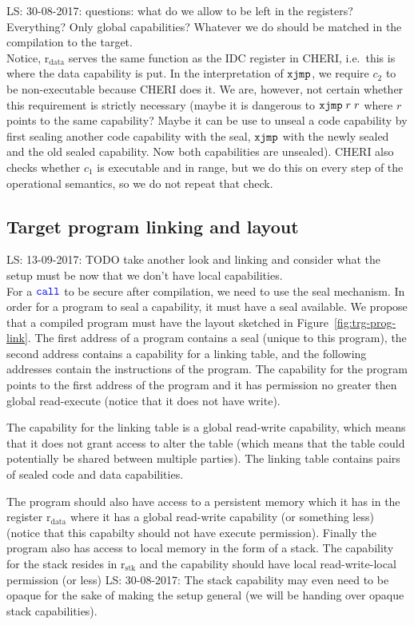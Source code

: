\documentclass[a4paper]{article}
\newcommand\lau[1]{{\color{purple} \sf \footnotesize {LS: #1}}\\}
\newcommand{\sourcecolor}[1]{\color{blue}}
\newcommand{\src}[1]{{\sourcecolor{} #1}}
\newcommand{\targetcolor}[1]{\color{black}}
\newcommand{\trg}[1]{{\targetcolor{} #1}}
\newcommand{\zinstr}[1]{\texttt{#1}}
\newcommand{\twoinstr}[3]{
  \ifthenelse{\equal{#2#3}{}}
  {\zinstr{#1}}
  {\zinstr{#1} \; #2 \; #3}
}
\newcommand{\scall}[2]{\twoinstr{\src{call}}{#1}{#2}}
\newcommand{\sxjmp}[2]{\twoinstr{\trg{xjmp}}{#1}{#2}}
\newcommand{\rstk}{\mathrm{r}_\mathrm{stk}}
\newcommand{\rdata}{\mathrm{r}_\mathrm{data}}
\begin{document}
\lau{30-08-2017: questions: what do we allow to be left in the registers? Everything? Only global capabilities? Whatever we do should be matched in the compilation to the target.}

Notice, $\rdata$ serves the same function as the IDC register in CHERI, i.e.\ this is where the data capability is put. In the interpretation of $\sxjmp{}{}$, we require $c_2$ to be non-executable because CHERI does it. We are, however, not certain whether this requirement is strictly necessary (maybe it is dangerous to $\sxjmp{r}{r}$ where $r$ points to the same capability? Maybe it can be use to unseal a code capability by first sealing another code capability with the seal, $\sxjmp{}{}$ with the newly sealed and the old sealed capability. Now both capabilities are unsealed). CHERI also checks whether $c_1$ is executable and in range, but we do this on every step of the operational semantics, so we do not repeat that check.



\subsection{Target program linking and layout}
\lau{13-09-2017: TODO take another look and linking and consider what the setup must be now that we don't have local capabilities.}
For a $\scall{}{}$ to be secure after compilation, we need to use the seal mechanism. In order for a program to seal a capability, it must have a seal available. We propose that a compiled program must have the layout sketched in Figure~\ref{fig:trg-prog-link}. The first address of a program contains a seal (unique to this program), the second address contains a capability for a linking table, and the following addresses contain the instructions of the program. The capability for the program points to the first address of the program and it has permission no greater then global read-execute (notice that it does not have write).

The capability for the linking table is a global read-write capability, which means that it does not grant access to alter the table (which means that the table could potentially be shared between multiple parties). The linking table contains pairs of sealed code and data capabilities.

The program should also have access to a persistent memory which it has in the register $\rdata$ where it has a global read-write capability (or something less) (notice that this capabilty should not have execute permission). Finally the program also has access to local memory in the form of a stack. The capability for the stack resides in $\rstk$ and the capability should have local read-write-local permission (or less)
\lau{30-08-2017: The stack capability may even need to be opaque for the sake of making the setup general (we will be handing over opaque stack capabilities).}
\end{document}
